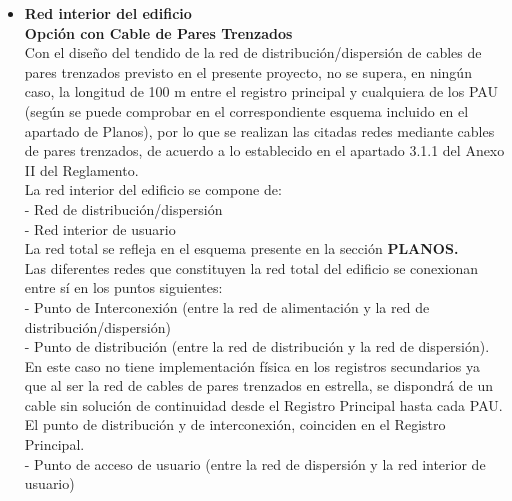 \begin{itemize}
	\item \textbf{Red interior del edificio}\\
\textbf{Opción con Cable de Pares Trenzados}\\
Con el diseño del tendido de la red de distribución/dispersión de cables de pares trenzados
previsto en el presente proyecto, no se supera, en ningún caso, la longitud de 100 m entre el
registro principal y cualquiera de los PAU (según se puede comprobar en el correspondiente
esquema incluido en el apartado de Planos), por lo que se realizan las citadas redes mediante
cables de pares trenzados, de acuerdo a lo establecido en el apartado 3.1.1 del Anexo II del
Reglamento.\\
La red interior del edificio se compone de:\\
- Red de distribución/dispersión\\
- Red interior de usuario\\
La red total se refleja en el esquema presente en la sección \textbf{PLANOS.}\\
Las diferentes redes que constituyen la red total del edificio se conexionan entre sí en los puntos
siguientes:\\
- Punto de Interconexión (entre la red de alimentación y la red de distribución/dispersión)\\
- Punto de distribución (entre la red de distribución y la red de dispersión). En este caso no tiene implementación física en los registros secundarios ya que al ser la red de cables de pares trenzados en estrella, se dispondrá de un cable sin solución de continuidad desde el Registro Principal hasta cada PAU. El punto de distribución y de interconexión, coinciden en el Registro Principal.\\
- Punto de acceso de usuario (entre la red de dispersión y la red interior de usuario)\\

\end{itemize}

